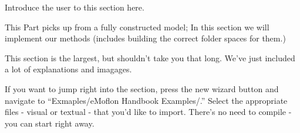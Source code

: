 Introduce the user to this section here.

This Part picks up from a fully constructed model; In this section we will implement our methods (includes building the correct folder spaces for them.)

This section is the largest, but shouldn't take you that long. We've just included a lot of explanations and imagages.

If you want to jump right into the section, press the new wizard button and navigate to ``Exmaples/eMoflon Handbook Examples/.'' Select the appropriate files -
visual or textual - that you'd like to import. There's no need to compile - you can start right away.

